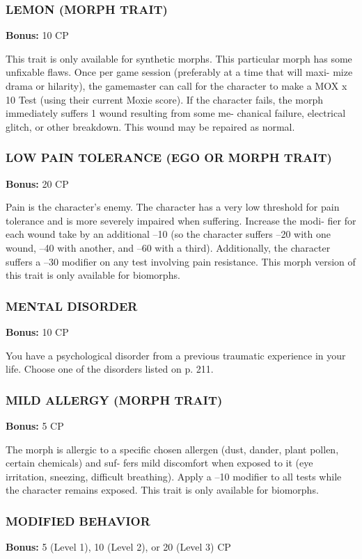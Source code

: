 \subsubsection{LEMON (MORPH TRAIT)}
\textbf{Bonus:} 10 CP

This trait is only available for synthetic morphs.
This particular morph has some unfixable flaws. Once
per game session (preferably at a time that will maxi-
mize drama or hilarity), the gamemaster can call for
the character to make a MOX x 10 Test (using their
current Moxie score). If the character fails, the morph
immediately suffers 1 wound resulting from some me-
chanical failure, electrical glitch, or other breakdown.
This wound may be repaired as normal.

\subsubsection{LOW PAIN TOLERANCE (EGO OR MORPH TRAIT)}
\textbf{Bonus:} 20 CP

Pain is the character’s enemy. The character has
a very low threshold for pain tolerance and is more
severely impaired when suffering. Increase the modi-
fier for each wound take by an additional –10 (so
the character suffers –20 with one wound, –40 with
another, and –60 with a third). Additionally, the
character suffers a –30 modifier on any test involving
pain resistance. This morph version of this trait is only
available for biomorphs.

\subsubsection{MENTAL DISORDER}
\textbf{Bonus:} 10 CP

You have a psychological disorder from a previous
traumatic experience in your life. Choose one of the
disorders listed on p. 211.

\subsubsection{MILD ALLERGY (MORPH TRAIT)}
\textbf{Bonus:} 5 CP

The morph is allergic to a specific chosen allergen
(dust, dander, plant pollen, certain chemicals) and suf-
fers mild discomfort when exposed to it (eye irritation,
sneezing, difficult breathing). Apply a –10 modifier to
all tests while the character remains exposed. This
trait is only available for biomorphs.

\subsubsection{MODIFIED BEHAVIOR}
\textbf{Bonus:} 5 (Level 1), 10 (Level 2), or 20 (Level 3) CP

